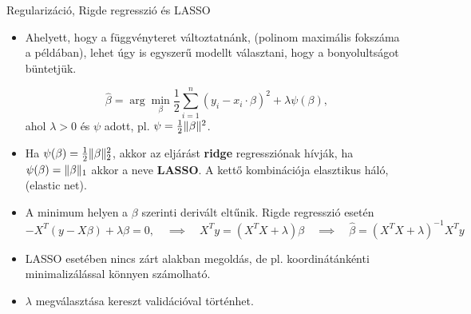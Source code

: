 \documentclass[aspectratio=169,notheorems,9pt,\option]{beamer}\usepackage[]{graphicx}\usepackage[]{color}
\begin{document}
\begin{frame}{Regularizáció, Rigde regresszió és LASSO}
  \begin{itemize}
    \item Ahelyett, hogy a függvényteret változtatnánk, 
    (polinom maximális fokszáma a példában), lehet úgy is egyszerű modellt választani, 
    hogy a bonyolultságot büntetjük. 
    
    \begin{displaymath}
      \hat\beta = 
      \arg\min_\beta \frac1{2}\sum_{i=1}^n (y_i-x_i\cdot \beta)^2 
       + \lambda \psi(\beta),
    \end{displaymath}
    ahol $\lambda>0$ és $\psi$ adott, pl. $\psi=\frac12\lVert\beta\rVert^2$. 
    
    \item Ha $\psi(\beta)=\frac12\lVert\beta\rVert_2^2$, akkor az eljárást \textbf{ridge} regressziónak hívják,
    ha $\psi(\beta)=\lVert\beta\rVert_1$ akkor a neve \textbf{LASSO}. 
    A kettő kombinációja elasztikus háló, (elastic net).
    \item A minimum helyen a $\beta$ szerinti derivált eltűnik. 
    Rigde regresszió esetén
    \begin{displaymath}
      -X^T(y-X\beta)+\lambda\beta=0,
      \quad\implies\quad 
      X^T y=(X^TX+\lambda)\beta
      \quad\implies\quad 
      \hat\beta= (X^TX+\lambda)^{-1}X^T y
    \end{displaymath}
    \item LASSO esetében nincs zárt alakban megoldás, de pl. koordinátánkénti 
    minimalizálással könnyen számolható.
    \item $\lambda$ megválasztása kereszt validációval történhet.
  \end{itemize}
\end{frame}
\end{document}
